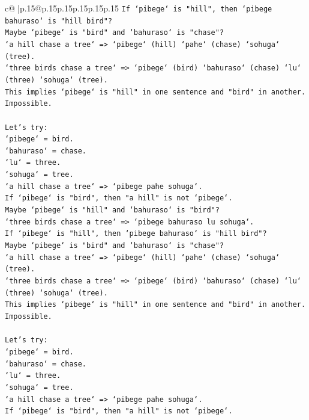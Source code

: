 \documentclass{article}
\begin{document}
{\begin{supertabular}{c@{$\;$}|p{.15\linewidth}@{}p{.15\linewidth}p{.15\linewidth}p{.15\linewidth}p{.15\linewidth}p{.15\linewidth}}
{{{\texttt{If `pibege` is "hill", then `pibege bahuraso` is "hill bird"?} \\
\texttt{Maybe `pibege` is "bird" and `bahuraso` is "chase"?} \\
\texttt{`a hill chase a tree` => `pibege` (hill) `pahe` (chase) `sohuga` (tree).} \\
\texttt{`three birds chase a tree` => `pibege` (bird) `bahuraso` (chase) `lu` (three) `sohuga` (tree).} \\
\texttt{This implies `pibege` is "hill" in one sentence and "bird" in another. Impossible.} \\
\\ 
\texttt{Let's try:} \\
\texttt{`pibege` = bird.} \\
\texttt{`bahuraso` = chase.} \\
\texttt{`lu` = three.} \\
\texttt{`sohuga` = tree.} \\
\texttt{`a hill chase a tree` => `pibege pahe sohuga`.} \\
\texttt{If `pibege` is "bird", then "a hill" is not `pibege`.} \\
\texttt{Maybe `pibege` is "hill" and `bahuraso` is "bird"?} \\
\texttt{`three birds chase a tree` => `pibege bahuraso lu sohuga`.} \\
\texttt{If `pibege` is "hill", then `pibege bahuraso` is "hill bird"?} \\
\texttt{Maybe `pibege` is "bird" and `bahuraso` is "chase"?} \\
\texttt{`a hill chase a tree` => `pibege` (hill) `pahe` (chase) `sohuga` (tree).} \\
\texttt{`three birds chase a tree` => `pibege` (bird) `bahuraso` (chase) `lu` (three) `sohuga` (tree).} \\
\texttt{This implies `pibege` is "hill" in one sentence and "bird" in another. Impossible.} \\
\\ 
\texttt{Let's try:} \\
\texttt{`pibege` = bird.} \\
\texttt{`bahuraso` = chase.} \\
\texttt{`lu` = three.} \\
\texttt{`sohuga` = tree.} \\
\texttt{`a hill chase a tree` => `pibege pahe sohuga`.} \\
\texttt{If `pibege` is "bird", then "a hill" is not `pibege`.} \\
}}}
\end{supertabular}}
\end{document}
